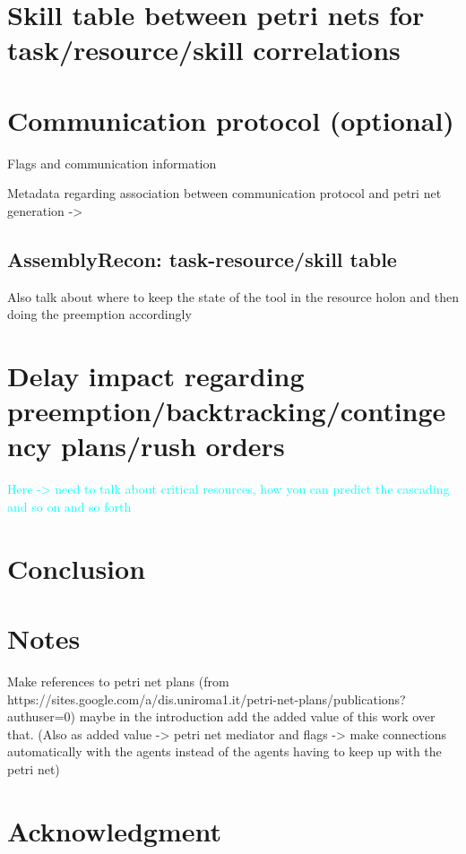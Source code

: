 \documentclass[a4paper,10pt]{article}
\begin{document}
\section{Skill table between petri nets for task/resource/skill correlations}

\section{Communication protocol (optional)}
Flags and communication information 

Metadata regarding association between communication protocol and petri net generation -> 


\subsection{AssemblyRecon: task-resource/skill table}

Also talk about where to keep the state of the tool in the resource holon and then doing the preemption accordingly


\section{Delay impact regarding preemption/backtracking/contingency plans/rush orders}
\textcolor{cyan}{Here -> need to talk about critical resources, how you can predict the cascading and so on and so forth}

\section{Conclusion}

\section{Notes}

Make references to petri net plans (from https://sites.google.com/a/dis.uniroma1.it/petri-net-plans/publications?authuser=0) maybe in the introduction add the added value of this work over that. (Also as added value -> petri net mediator and flags -> make connections automatically with the agents instead of the agents having to keep up with the petri net)


\section*{Acknowledgment}



\end{document}
